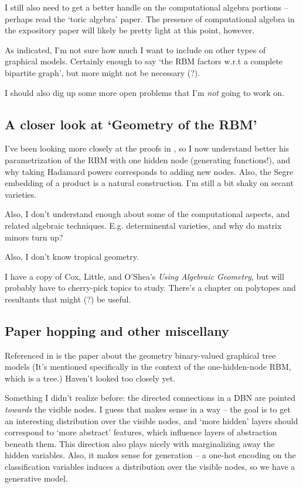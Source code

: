 \documentclass[12pt]{article}
\begin{document}
I still also need to get a better handle on the computational algebra portions
-- perhaps read the `toric algebra' paper.  The presence of computational
algebra in the expository paper will likely be pretty light at this point,
however.

As indicated, I'm not sure how much I want to include on other types of
graphical models.  Certainly enough to say `the RBM factors w.r.t a complete
bipartite graph', but more might not be necessary (?).

I should also dig up some more open problems that I'm \emph{not} going to work
on.


\subsection{A closer look at `Geometry of the RBM'}

I've been looking more closely at the proofs in \cite{CMS09}, so I now understand
better his parametrization of the RBM with one hidden node (generating
functions!), and why taking Hadamard powers corresponds to adding new nodes.
Also, the Segre embedding of a product is a natural construction.  I'm still a
bit shaky on secant varieties.

Also, I don't understand enough about some of the computational aspects, and
related algebraic techniques.  E.g. determinental varieties, and why do matrix
minors turn up?

Also, I don't know tropical geometry.

I have a copy of Cox, Little, and O'Shea's \emph{Using Algebraic Geometry}, but
will probably have to cherry-pick topics to study.  There's a chapter on
polytopes and resultants that might (?) be useful.

\subsection{Paper hopping and other miscellany}

Referenced in \cite{CMS09} is the paper \cite{B2} about the geometry binary-valued
graphical tree models  (It's mentioned specifically in the context of the
one-hidden-node RBM, which is a tree.)  Haven't looked too closely yet.

Something I didn't realize before: the directed connections in a DBN are pointed
\emph{towards} the visible nodes.  I guess that makes sense in a way -- the goal
is to get an interesting distribution over the visible nodes, and `more hidden'
layers should correspond to `more abstract' features, which influence layers of
abstraction beneath them.  This direction also plays nicely with marginalizing
away the hidden variables.  Also, it makes sense for generation -- a one-hot
encoding on the classification variables induces a distribution over the visible
nodes, so we have a generative model.
\end{document}
